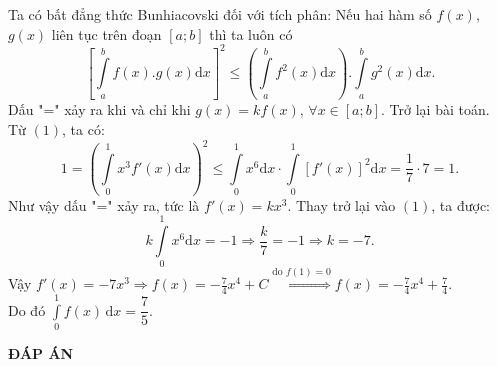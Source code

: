 \documentclass[12pt,a4paper,twoside]{book}
\begin{document}
\begin{ex}
{		 Ta có 
		bất đẳng thức  Bunhiacovski đối với tích phân: Nếu hai hàm số $f(x)$, $g(x)$ liên tục trên đoạn $[a; b]$ thì ta luôn có
		$${\left[ {\int\limits_a^b {f(x).g(x)\mathrm{d}x} } \right]^2} \le \left( {\int\limits_a^b {{f^2}(x)\mathrm{d}x} } \right).\int\limits_a^b {{g^2}(x)\mathrm{d}x}.$$
		Dấu "=" xảy ra khi và chỉ khi $g(x) = kf(x),\,\forall x \in \left[ {a;b} \right]$. Trở lại bài toán. 
		Từ $(1)$, ta có:
		$$1 = {\left( {\int\limits_0^1 {{x^3}f'(x)\mathrm{d}x} } \right)^2} \le \int\limits_0^1 {{x^6}\mathrm{d}x}  \cdot \int\limits_0^1 {{{\left[ {f'(x)} \right]}^2}\mathrm{d}x}  = \frac{1}{7} \cdot 7 = 1.$$
		Như vậy dấu "=" xảy ra, tức là $f'(x) = k{x^3}$. Thay trở lại vào $(1)$, ta được:
		$$k\int\limits_0^1 {{x^6}\mathrm{d}x}  =  - 1 \Rightarrow \frac{k}{7} =  - 1 \Rightarrow k =  - 7.$$
		Vậy $\displaystyle f'(x) =  - 7{x^3} \Rightarrow f(x) =  - \frac{7}{4}{x^4} + C\mathop  \Rightarrow \limits^{\text{do}\,\,f(1) = 0} f(x) =  - \frac{7}{4}{x^4} + \frac{7}{4}.$\\
		Do đó $\displaystyle \int \limits_{0}^{1}f(x) \mathrm{\,d}x=\dfrac{7}{5}.$}
\end{ex}
\newpage
\begin{center}
	\textbf{ĐÁP ÁN}
\end{center}
\begin{multicols}{10}
	
\end{multicols}
\end{document}
